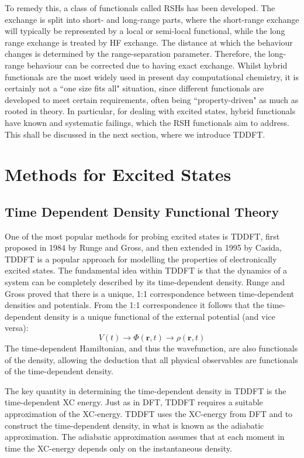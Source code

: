 To remedy this, a class of functionals called \acp{RSH} has been developed. The exchange is split into short- and long-range parts, where the short-range exchange will typically be represented by a local or semi-local functional, while the long range exchange is treated by \ac{HF} exchange. The distance at which the behaviour changes is determined by the range-separation parameter. Therefore, the long-range behaviour can be corrected due to having exact exchange. Whilst hybrid functionals are the most widely used in present day computational chemistry, it is certainly not a ``one size fits all" situation, since different functionals are developed to meet certain requirements, often being ``property-driven" as much as rooted in theory. In particular, for dealing with excited states, hybrid functionals have known and systematic failings, which the \ac{RSH} functionals aim to address. This shall be discussed in the next section, where we introduce \ac{TDDFT}.
\section{Methods for Excited States}
\subsection{Time Dependent Density Functional Theory}\label{section: tddft}
One of the most popular methods for probing excited states is \acf{TDDFT}, first proposed in 1984 by Runge and Gross, and then extended in 1995 by Casida, TDDFT is a popular approach for modelling the properties of electronically excited states. The fundamental idea within TDDFT is that the dynamics of a system can be completely described by its time-dependent density. Runge and Gross proved that there is a unique, 1:1 correspondence between time-dependent densities and potentials.\cite{Runge1984} From the 1:1 correspondence it follows that the time-dependent density is a unique functional of the external potential (and vice versa):
\begin{equation}
    V(t)\rightarrow\Phi(\bm{r},t)\rightarrow\rho(\bm{r},t)
\end{equation}
The time-dependent Hamiltonian, and thus the wavefunction, are also functionals of the density, allowing the deduction that all physical observables are functionals of the time-dependent density.

The key quantity in determining the time-dependent density in \ac{TDDFT} is the time-dependent \acf{XC} energy. Just as in \ac{DFT}, \ac{TDDFT} requires a suitable approximation of the \ac{XC}-energy. \ac{TDDFT} uses the \ac{XC}-energy from \ac{DFT} and to construct the time-dependent density, in what is known as the adiabatic approximation. The adiabatic approximation assumes that at each moment in time the \ac{XC}-energy depends only on the instantaneous density.


